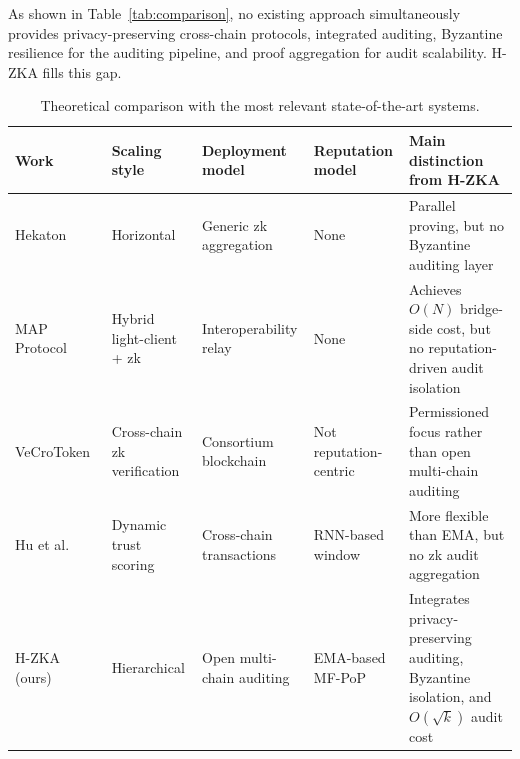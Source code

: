 \documentclass[journal]{IEEEtran}
\renewcommand{\arraystretch}{1.2}
\begin{document}
\begin{table}[h!]
\centering
\caption{Comparison of related cross-chain approaches.}
\label{tab:comparison}
\end{table}

As shown in Table~\ref{tab:comparison}, no existing approach simultaneously provides privacy-preserving cross-chain protocols, integrated auditing, Byzantine resilience for the auditing pipeline, and proof aggregation for audit scalability. H-ZKA fills this gap.

\begin{table}[t]
\centering
\caption{Theoretical comparison with the most relevant state-of-the-art systems.}
\label{tab:theory}
\renewcommand{\arraystretch}{1.3}
\begin{tabular}{p{}p{}p{}p{}p{}}
\toprule
Work & Scaling style & Deployment model & Reputation model & Main distinction from H-ZKA \\
\midrule
Hekaton~\cite{rosenberg2024hekaton} & Horizontal & Generic zk aggregation & None & Parallel proving, but no Byzantine auditing layer \\
MAP Protocol~\cite{cao2025map} & Hybrid light-client + zk & Interoperability relay & None & Achieves $O(N)$ bridge-side cost, but no reputation-driven audit isolation \\
VeCroToken~\cite{ding2025vecrotoken} & Cross-chain zk verification & Consortium blockchain & Not reputation-centric & Permissioned focus rather than open multi-chain auditing \\
Hu et al.~\cite{hu2024reputation} & Dynamic trust scoring & Cross-chain transactions & RNN-based window & More flexible than EMA, but no zk audit aggregation \\
H-ZKA (ours) & Hierarchical & Open multi-chain auditing & EMA-based MF-PoP & Integrates privacy-preserving auditing, Byzantine isolation, and $O(\sqrt{k})$ audit cost \\
\bottomrule
\end{tabular}
\end{table}
\end{document}
